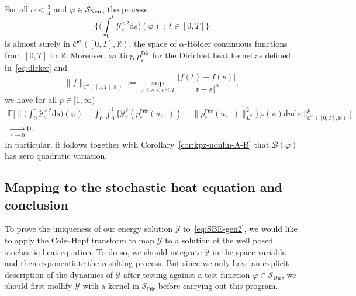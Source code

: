 \documentclass[AHL,Unicode,longabstracts]{cedram}
\DeclareMathOperator{\Dir}{Dir}
\newcommand{\bb}[1]{{\mathbb #1}}
\newcommand{\mc}[1]{{\mathcal #1}}
\renewcommand{\mc}[1]{{\mathcal #1}}
\newcommand{\SD}{\ensuremath{\mc S_{\Dir}}}
\renewcommand{\le}{\leqslant}
\newcommand*{\dd}{\mathrm{d}}
\newcommand*{\ds}{\dd s}
\newcommand*{\du}{\dd u}
\begin{document}
\begin{lemm}\label{lem:kpz-nonlin-conv}
For all $\alpha < \frac34$ and $\varphi
\in \mc S_{\rm{Neu}}$, the process
\[
\bigg\{\bigg(\int_0^t \mc Y_s^{\diamond 2} \ds \bigg)(\varphi) \; ; \; t \in [0, T]\bigg\}
\]
is almost surely in $\mc C^{\alpha} ([0, T], \mathbb{R})$, the space of $\alpha$-H\"older continuous functions from $[0,T]$ to $\bb R$. Moreover, writing $p^{\Dir}_\varepsilon$ for the Dirichlet heat kernel as defined in~\eqref{eq:dirker} and
\[
\| f \|_{\mc C^{\alpha} ([0, T],\mathbb{R})} := \sup_{0 \le s < t \le T} \frac{|f(t)-f(s)|}{|t-s|^\alpha},
\]
we have for all $p \in [1, \infty)$
\begin{align*}
\mathbb{E} \bigg[\bigg\|
\bigg(\int_0^{\cdot} \mc Y_s^{\diamond 2} \ds\bigg) (\varphi) - \int_0^{\cdot}
\int_0^1 \Big\{ \mc Y^2_s \left(p^{\Dir}_{\varepsilon} (u, \cdot\,)
\right) - \big\| p^{\Dir}_{\varepsilon} (u, \cdot\,) \big\|_{L^2}^2 \Big\} \varphi (u) \du \ds \bigg\|_{\mc C^{\alpha} ([0, T],
\mathbb{R})}^p \bigg] \\ \xrightarrow[\varepsilon \to 0]{} 0.
\end{align*}
In particular, it follows together with Corollary~\ref{cor:kpz-nonlin-A-B} that $\mc B(\varphi)$ has zero quadratic variation.
\end{lemm}



\subsection{Mapping to the stochastic heat equation and conclusion}\label{ssec:map}

To prove the uniqueness of our energy solution $\mc Y$ to~\eqref{eq:SBE-gen2}, we would like to apply the Cole--Hopf transform to map $\mc Y$ to a solution of the well posed stochastic heat equation. To do so, we should integrate $\mc Y$ in the space variable and then exponentiate the resulting process. But since we only have an explicit description of the dynamics of $\mc Y$ after testing against a test function $\varphi \in \SD$, we should first mollify $\mc Y$ with a kernel in $\SD$ before carrying out this program.
\end{document}
